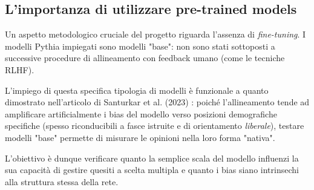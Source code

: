 \documentclass[../relazione.tex]{subfiles}
\begin{document}
\subsection{L'importanza di utilizzare pre-trained models}

Un aspetto metodologico cruciale del progetto riguarda l'assenza di \emph{fine-tuning}. I modelli Pythia impiegati sono modelli "base": non sono stati sottoposti a successive procedure di allineamento con feedback umano (come le tecniche RLHF). 

L'impiego di questa specifica tipologia di modelli è funzionale a quanto dimostrato nell'articolo di Santurkar et al. (2023) \cite{santurkar2023whose}: poiché l'allineamento tende ad amplificare artificialmente i bias del modello verso posizioni demografiche specifiche (spesso riconducibili a fasce istruite e di orientamento \emph{liberale}), testare modelli "base" permette di misurare le opinioni nella loro forma "nativa". 

L'obiettivo è dunque verificare quanto la semplice scala del modello influenzi la sua capacità di gestire quesiti a scelta multipla e quanto i bias siano intrinsechi alla struttura stessa della rete.
\end{document}
